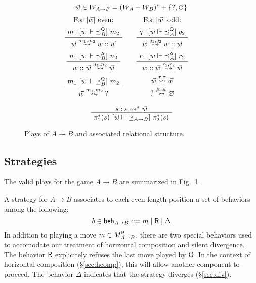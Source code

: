 \begin{figure}
  \vspace{1em}
  \noindent{}
  \[
    \vec{w} \in W_{A \rightarrow B} = (W_A + W_B)^* + \{ \mathsf{?} , \varnothing\}
  \]
  \vspace{1ex}
  \[
    \begin{array}{c@{\qquad}c@{\qquad}c}
      \text{For $\lvert \vec{w} \rvert$ even:} &
      \text{For $\lvert \vec{w} \rvert$ odd:}
      \\[1ex]
      \AxiomC{$m_1 \ifr{w \Vdash {\preceq}_B^\kw{Q}} m_2$}
      \UnaryInfC{$\vec{w} \stackrel{m_1, m_2}{\leadsto} w :: \vec{w}$}
      \DisplayProof
      &
      \AxiomC{$q_1 \ifr{w \Vdash {\preceq}_A^\kw{Q}} q_2$}
      \UnaryInfC{$\vec{w} \stackrel{q_1, q_2}{\leadsto} w :: \vec{w}$}
      \DisplayProof
      \\[3.3ex]
      \AxiomC{$n_1 \ifr{w \Vdash {\preceq}_B^\kw{A}} n_2$}
      \UnaryInfC{$w :: \vec{w} \stackrel{n_1, n_2}{\leadsto} \vec{w}$}
      \DisplayProof
      &
      \AxiomC{$r_1 \ifr{w \Vdash {\preceq}_A^\kw{A}} r_2$}
      \UnaryInfC{$w :: \vec{w} \stackrel{r_1, r_2}{\leadsto} \vec{w}$}
      \DisplayProof
      \\[3.3ex]
      \AxiomC{$m_1 \ifr{w \Vdash {\preceq}_B^\kw{Q}} m_2$}
      \UnaryInfC{$\vec{w} \stackrel{m_1, m_2}{\leadsto} \kw{?}$}
      \DisplayProof
      &
      \begin{array}{c}
        \vec{w} \stackrel{\tau, \tau}{\leadsto} \vec{w} \\[.5ex]
        \kw{?} \stackrel{\#,\#}{\leadsto} \varnothing
      \end{array}
    \end{array}
  \]

  \vspace{1em}
  \noindent{}
  \[
      \AxiomC{$s : \varepsilon \leadsto^* \vec{w}$}
      \UnaryInfC{$\pi_1^*(s)
         \ifr{\vec{w} \Vdash {\preceq}_{A \rightarrow B}}
         \pi_2^*(s)$}
      \DisplayProof
  \]
  \caption{Plays of $A \rightarrow B$ and associated relational structure.}
  \label{fig:plays}
\end{figure}

\subsection{Strategies}

The valid plays for the game $A \rightarrow B$
are summarized in Fig.~\ref{fig:plays}.


A strategy for $A \rightarrow B$
associates to each even-length position
a set of behaviors among the following:
\[
    b \in  \mathsf{beh} _{A \rightarrow B} ::= m \mid  \mathsf{R}  \mid \Delta
\]
In addition to playing a move $m \in M_{A \rightarrow B}^{ \mathsf{P} }$,
there are two special behaviors
used to accomodate our treatment of
horizontal composition and silent divergence.
The behavior $ \mathsf{R} $ explicitely refuses the last move played by $ \mathsf{O} $.
In the context of horizontal composition (\S\ref{sec:hcomp}),
this will allow another component to proceed.
The behavior $\Delta$ indicates that the strategy diverges (\S\ref{sec:div}).

